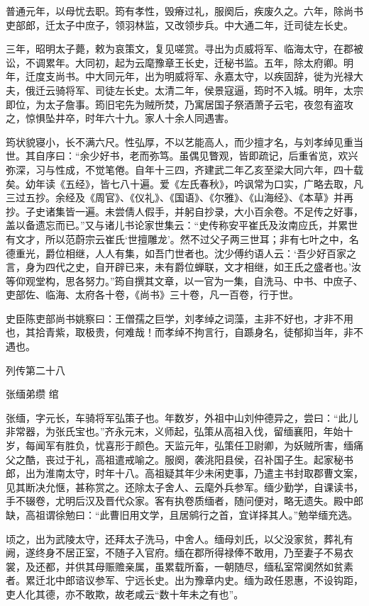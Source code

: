 \documentclass[12pt,UTF8]{ctexbook}
\begin{document}
普通元年，以母忧去职。筠有孝性，毁瘠过礼，服阕后，疾废久之。六年，除尚书吏部郎，迁太子中庶子，领羽林监，又改领步兵。中大通二年，迁司徒左长史。

三年，昭明太子薨，敕为哀策文，复见嗟赏。寻出为贞威将军、临海太守，在郡被讼，不调累年。大同初，起为云麾豫章王长史，迁秘书监。五年，除太府卿。明年，迁度支尚书。中大同元年，出为明威将军、永嘉太守，以疾固辞，徙为光禄大夫，俄迁云骑将军、司徒左长史。太清二年，侯景寇逼，筠时不入城。明年，太宗即位，为太子詹事。筠旧宅先为贼所焚，乃寓居国子祭酒萧子云宅，夜忽有盗攻之，惊惧坠井卒，时年六十九。家人十余人同遇害。

筠状貌寝小，长不满六尺。性弘厚，不以艺能高人，而少擅才名，与刘孝绰见重当世。其自序曰：“余少好书，老而弥笃。虽偶见瞥观，皆即疏记，后重省览，欢兴弥深，习与性成，不觉笔倦。自年十三四，齐建武二年乙亥至梁大同六年，四十载矣。幼年读《五经》，皆七八十遍。爱《左氏春秋》，吟讽常为口实，广略去取，凡三过五抄。余经及《周官》、《仪礼》、《国语》、《尔雅》、《山海经》、《本草》并再抄。子史诸集皆一遍。未尝倩人假手，并躬自抄录，大小百余卷。不足传之好事，盖以备遗忘而已。”又与诸儿书论家世集云：“史传称安平崔氏及汝南应氏，并累世有文才，所以范蔚宗云崔氏‘世擅雕龙’。然不过父子两三世耳；非有七叶之中，名德重光，爵位相继，人人有集，如吾门世者也。沈少傅约语人云：‘吾少好百家之言，身为四代之史，自开辟已来，未有爵位蝉联，文才相继，如王氏之盛者也。’汝等仰观堂构，思各努力。”筠自撰其文章，以一官为一集，自洗马、中书、中庶子、吏部佐、临海、太府各十卷，《尚书》三十卷，凡一百卷，行于世。

史臣陈吏部尚书姚察曰：王僧孺之巨学，刘孝绰之词藻，主非不好也，才非不用也，其拾青紫，取极贵，何难哉！而孝绰不拘言行，自踬身名，徒郁抑当年，非不遇也。





列传第二十八

张缅弟缵 绾

张缅，字元长，车骑将军弘策子也。年数岁，外祖中山刘仲德异之，尝曰：“此儿非常器，为张氏宝也。”齐永元末，义师起，弘策从高祖入伐，留缅襄阳，年始十岁，每闻军有胜负，忧喜形于颜色。天监元年，弘策任卫尉卿，为妖贼所害，缅痛父之酷，丧过于礼，高祖遣戒喻之。服阕，袭洮阳县侯，召补国子生。起家秘书郎，出为淮南太守，时年十八。高祖疑其年少未闲吏事，乃遣主书封取郡曹文案，见其断决允惬，甚称赏之。还除太子舍人、云麾外兵参军。缅少勤学，自课读书，手不辍卷，尤明后汉及晋代众家。客有执卷质缅者，随问便对，略无遗失。殿中郎缺，高祖谓徐勉曰：“此曹旧用文学，且居鹓行之首，宜详择其人。”勉举缅充选。

顷之，出为武陵太守，还拜太子洗马，中舍人。缅母刘氏，以父没家贫，葬礼有阙，遂终身不居正室，不随子入官府。缅在郡所得禄俸不敢用，乃至妻子不易衣裳，及还都，并供其母赈赡亲属，虽累载所畜，一朝随尽，缅私室常阒然如贫素者。累迁北中郎谘议参军、宁远长史。出为豫章内史。缅为政任恩惠，不设钩距，吏人化其德，亦不敢欺，故老咸云“数十年未之有也”。
\end{document}
